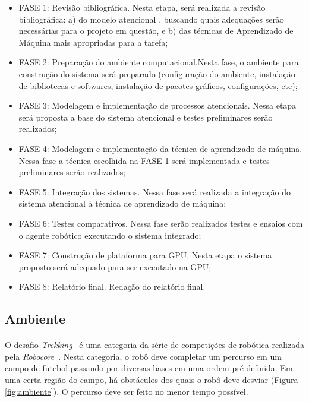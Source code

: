 \documentclass[11pt]{article}
\newcommand{\tit}[1]{\textit{#1}}
\begin{document}
\begin{itemize}
	\item FASE  1:  Revisão  bibliográfica. Nesta etapa, será realizada a 
		revisão bibliográfica:  a) do  modelo  atencional \cite{esther}, 
		buscando quais adequações serão necessárias para o projeto em questão, 
		e b) das técnicas de Aprendizado de Máquina mais 
		apropriadas para a tarefa;
	\item FASE  2: Preparação do ambiente computacional.Nesta fase, o ambiente para construção do sistema será preparado 
		(configuração do ambiente, instalação de bibliotecas e softwares, 
		instalação de pacotes gráficos, configurações, etc); 
	\item FASE  3:  Modelagem e implementação de processos atencionais.  
		Nessa  etapa  será proposta a base do sistema  atencional e testes 
		preliminares serão realizados;
	\item FASE  4:  Modelagem e implementação da técnica de aprendizado de 
		máquina.  
		Nessa  fase  a  técnica escolhida na FASE 1 será implementada e 
		testes preliminares serão realizados; 
	\item FASE  5:  Integração dos sistemas.
		Nessa fase será realizada a integração do sistema atencional à técnica 
		de aprendizado de máquina;
	\item FASE  6:  Testes comparativos. 
		Nessa fase serão realizados testes  e  ensaios  com  o  agente  
		robótico executando o sistema integrado;
	\item FASE  7:  Construção de plataforma para GPU. 
		Nesta etapa o sistema proposto será adequado para ser executado na GPU;
	\item FASE  8:  Relatório final. 
		Redação do relatório final.
\end{itemize}

\subsection{Ambiente}
\paragraph{}
O desafio \tit{Trekking}~\cite{trekking_regras} é uma categoria da série de 
competições de robótica realizada pela \tit{Robocore}~\cite{robocore}. 
Nesta categoria, o robô deve completar um percurso em 
um campo de futebol passando por diversas bases em uma ordem pré-definida.
Em uma certa região do campo, há obstáculos dos quais o robô deve desviar 
(Figura \ref{fig:ambiente}).  
O percurso deve ser feito no menor tempo possível.
\end{document}
